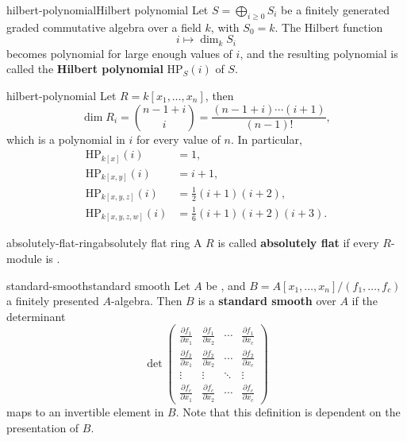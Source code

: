 \begin{topic}{hilbert-polynomial}{Hilbert polynomial}
    Let $S = \bigoplus_{i \ge 0} S_i$ be a finitely generated graded commutative algebra over a field $k$, with $S_0 = k$. The Hilbert function
    \[ i \mapsto \dim_k S_i \]
    becomes polynomial for large enough values of $i$, and the resulting polynomial is called the \textbf{Hilbert polynomial} $\text{HP}_S(i)$ of $S$.
\end{topic}

\begin{example}{hilbert-polynomial}
    Let $R = k[x_1, \ldots, x_n]$, then
    \[ \dim R_i = \binom{n - 1 + i}{i} = \frac{(n - 1 + i) \cdots (i + 1)}{(n - 1)!} , \]
    which is a polynomial in $i$ for every value of $n$. In particular,
    \[ \begin{aligned}
        \text{HP}_{k[x]}(i) &= 1, \\
        \text{HP}_{k[x, y]}(i) &= i + 1, \\
        \text{HP}_{k[x, y, z]}(i) &= \tfrac{1}{2} (i + 1)(i + 2), \\
        \text{HP}_{k[x, y, z, w]}(i) &= \tfrac{1}{6} (i + 1)(i + 2)(i + 3) .
    \end{aligned} \]
\end{example}

\begin{topic}{absolutely-flat-ring}{absolutely flat ring}
    A  $R$ is called \textbf{absolutely flat} if every $R$-module is .
\end{topic}

\begin{topic}{standard-smooth}{standard smooth}
    Let $A$ be , and $B = A[x_1, \ldots, x_n] / (f_1, \ldots, f_c)$ a finitely presented $A$-algebra. Then $B$ is a \textbf{standard smooth} over $A$ if the determinant
    \[ \det \begin{pmatrix}
        \frac{\partial f_1}{\partial x_1} & \frac{\partial f_1}{\partial x_2} & \cdots & \frac{\partial f_1}{\partial x_c} \\
        \frac{\partial f_2}{\partial x_1} & \frac{\partial f_2}{\partial x_2} & \cdots & \frac{\partial f_2}{\partial x_c} \\ 
        \vdots & \vdots & \ddots & \vdots \\ 
        \frac{\partial f_c}{\partial x_1} & \frac{\partial f_c}{\partial x_2} & \cdots & \frac{\partial f_c}{\partial x_c}
    \end{pmatrix} \]
    maps to an invertible element in $B$. Note that this definition is dependent on the presentation of $B$.
\end{topic}

